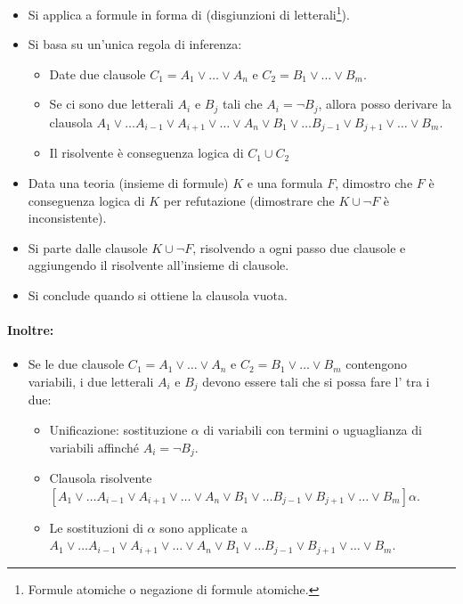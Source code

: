 \begin{itemize}
  \item Si applica a formule in forma di  (disgiunzioni di letterali\footnote{Formule atomiche o negazione di formule atomiche.}). 
  \item Si basa su un'unica regola di inferenza: 
    \begin{itemize}
      \item Date due clausole $C_1=A_1 \lor \dots \lor A_n$ e $C_2=B_1 \lor \dots \lor B_m$. 
      \item Se ci sono due letterali $A_i$ e $B_j$ tali che $A_i = \neg B_j$, allora posso derivare la clausola  $A_1 \lor \dots A_{i-1} \lor A_{i+1} \lor \dots \lor A_n \lor B_1 \lor \dots B_{j-1} \lor B_{j+1} \lor \dots \lor B_m$. 
      \item Il risolvente è conseguenza logica di $C_1 \cup C_2$
    \end{itemize}
  \item Data una teoria (insieme di formule) $K$ e una formula $F$, dimostro
che $F$ è conseguenza logica di $K$ per refutazione (dimostrare che $K \cup \neg F$ è inconsistente). 
\item Si parte dalle clausole $K \cup \neg F$, risolvendo a ogni passo due
clausole e aggiungendo il risolvente all’insieme di clausole. 
\item Si conclude quando si ottiene la clausola vuota.
\end{itemize}


\paragraph{Inoltre:}

\begin{itemize}
  \item Se le due clausole $C_1=A_1 \lor \dots \lor A_n$ e $C_2=B_1 \lor \dots \lor B_m$ contengono variabili, i due letterali $A_i$ e $B_j$ devono essere tali che si possa fare l’ tra i due: 
    \begin{itemize}
      \item Unificazione: sostituzione $\alpha$ di variabili con termini o uguaglianza di variabili affinché $A_i=\neg B_j$.
      \item Clausola risolvente $[A_1 \lor \dots A_{i-1} \lor A_{i+1} \lor \dots \lor A_n \lor B_1 \lor \dots B_{j-1} \lor B_{j+1} \lor \dots \lor B_m] \alpha$. 
      \item Le sostituzioni di $\alpha$ sono applicate a $A_1 \lor \dots A_{i-1} \lor A_{i+1} \lor \dots \lor A_n \lor B_1 \lor \dots B_{j-1} \lor B_{j+1} \lor \dots \lor B_m$.
    \end{itemize}
\end{itemize}

